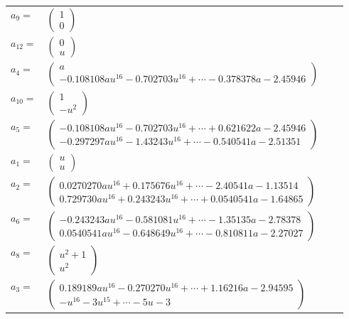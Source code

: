 \documentclass[1p]{elsarticle_modified}
\theoremstyle{definition}
\begin{document}
\begin{tabular}{m{7pt} m{180pt} m{7pt} m{180pt} }
\flushright $a_{9}=$&$\begin{pmatrix}1\\0\end{pmatrix}$ \\
\flushright $a_{12}=$&$\begin{pmatrix}0\\u\end{pmatrix}$ \\
\flushright $a_{4}=$&$\begin{pmatrix}a\\-0.108108 a u^{16}-0.702703 u^{16}+\cdots-0.378378 a-2.45946\end{pmatrix}$ \\
\flushright $a_{10}=$&$\begin{pmatrix}1\\- u^2\end{pmatrix}$ \\
\flushright $a_{5}=$&$\begin{pmatrix}-0.108108 a u^{16}-0.702703 u^{16}+\cdots+0.621622 a-2.45946\\-0.297297 a u^{16}-1.43243 u^{16}+\cdots-0.540541 a-2.51351\end{pmatrix}$ \\
\flushright $a_{1}=$&$\begin{pmatrix}u\\u\end{pmatrix}$ \\
\flushright $a_{2}=$&$\begin{pmatrix}0.0270270 a u^{16}+0.175676 u^{16}+\cdots-2.40541 a-1.13514\\0.729730 a u^{16}+0.243243 u^{16}+\cdots+0.0540541 a-1.64865\end{pmatrix}$ \\
\flushright $a_{6}=$&$\begin{pmatrix}-0.243243 a u^{16}-0.581081 u^{16}+\cdots-1.35135 a-2.78378\\0.0540541 a u^{16}-0.648649 u^{16}+\cdots-0.810811 a-2.27027\end{pmatrix}$ \\
\flushright $a_{8}=$&$\begin{pmatrix}u^2+1\\u^2\end{pmatrix}$ \\
\flushright $a_{3}=$&$\begin{pmatrix}0.189189 a u^{16}-0.270270 u^{16}+\cdots+1.16216 a-2.94595\\- u^{16}-3 u^{15}+\cdots-5 u-3\end{pmatrix}$ \\

\end{tabular}
\end{document}
